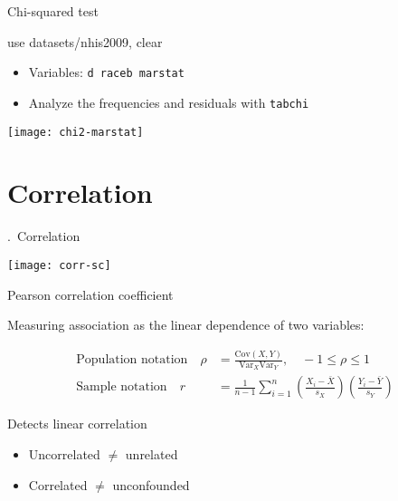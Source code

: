 \documentclass[t]{beamer}
\begin{document}
	
	\begin{frame}[t]{Chi-squared test}
		
		\begin{exampleblock}{use datasets/nhis2009, clear}
		
			\begin{itemize}
				\item Variables: \texttt{d raceb marstat}
							
				\item Analyze the frequencies and residuals with \texttt{tabchi}
				
			\end{itemize}

		\end{exampleblock}
		
		\begin{center}
			\texttt{[image: chi2-marstat]}
		\end{center}
		
	\end{frame}
		
	
	\section{Correlation}
	
    \begin{frame}[c]{\thesection.~Correlation}
	
		\begin{center}
			\texttt{[image: corr-sc]}
		\end{center}
				
	\end{frame}
	
	\begin{frame}{Pearson correlation coefficient}
	
		\begin{block}{Measuring association as the linear dependence of two variables:}
		
			\begin{align*}
				\text{Population notation} \quad
				\rho &= \frac{\text{Cov}(X,Y)}{\text{Var}_X\text{Var}_Y}, \quad
				-1 \leq \rho \leq 1
				\\
				\text{Sample notation} \quad
				r &= \frac{1}{n-1} \sum ^n _{i=1} (\frac{X_i - \bar{X}}{s_X}) (\frac{Y_i - \bar{Y}}{s_Y})
			\end{align*}

		\end{block}
		
		\begin{alertblock}{Detects linear correlation}

			\begin{itemize}
				\item Uncorrelated $\neq$ unrelated
				\item Correlated $\neq$ unconfounded
			\end{itemize}
						
		\end{alertblock}
					
	\end{frame}
\end{document}
